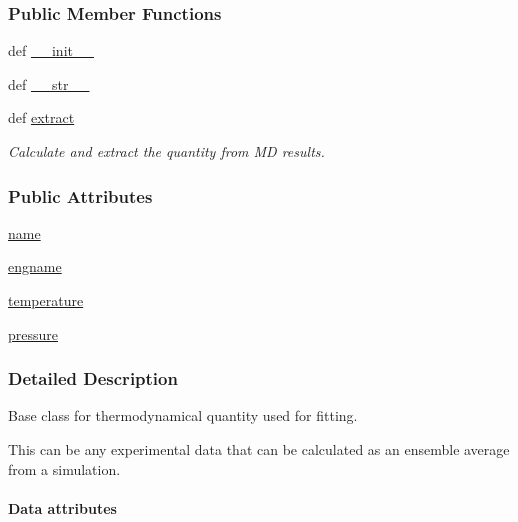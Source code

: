 \subsubsection*{Public Member Functions}
\begin{DoxyCompactItemize}
\item 
def \hyperlink{classforcebalance_1_1quantity_1_1Quantity_a33f2f73a76a335864ee5cdc9c299fe83}{\-\_\-\-\_\-init\-\_\-\-\_\-}
\item 
def \hyperlink{classforcebalance_1_1quantity_1_1Quantity_a0b789c405027c2b184f268702d751ff5}{\-\_\-\-\_\-str\-\_\-\-\_\-}
\item 
def \hyperlink{classforcebalance_1_1quantity_1_1Quantity_af237c272a8ec761b4f9b64980eded918}{extract}
\begin{DoxyCompactList}\small\item\em Calculate and extract the quantity from M\-D results. \end{DoxyCompactList}\end{DoxyCompactItemize}
\subsubsection*{Public Attributes}
\begin{DoxyCompactItemize}
\item 
\hyperlink{classforcebalance_1_1quantity_1_1Quantity_a9122f1e96aa8c0cd146694656bcd0649}{name}
\item 
\hyperlink{classforcebalance_1_1quantity_1_1Quantity_a2cd1c71d0780a12b3cbf308d05737055}{engname}
\item 
\hyperlink{classforcebalance_1_1quantity_1_1Quantity_a30da0699f09b247b74014a9a1a6a2d09}{temperature}
\item 
\hyperlink{classforcebalance_1_1quantity_1_1Quantity_a972fbe22434f2aedca70addaed1a0bea}{pressure}
\end{DoxyCompactItemize}


\subsubsection{Detailed Description}
Base class for thermodynamical quantity used for fitting. 

This can be any experimental data that can be calculated as an ensemble average from a simulation.

\paragraph*{Data attributes }


